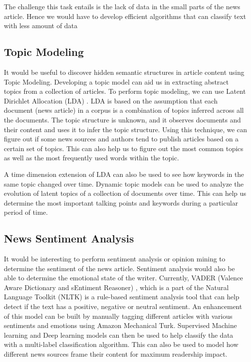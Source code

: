 \documentclass[11pt]{article}
\begin{document}
The challenge this task entails is the lack of data in the small parts of the news article. Hence we would have to develop efficient algorithms that can classify text with less amount of data


\subsection{Topic Modeling}

It would be useful to discover hidden semantic structures in article content using Topic Modeling. Developing a topic model can aid us in extracting abstract topics from a collection of articles. To perform topic modeling, we can use Latent Dirichlet Allocation (LDA) \cite{blei2002latent}. LDA is based on the assumption that each document (news article) in a corpus is a combination of topics inferred across all the documents. The topic structure is unknown, and it observes documents and their content and uses it to infer the topic structure\cite{jacobi2016quantitative}. Using this technique, we can figure out if some news sources and authors tend to publish articles based on a certain set of topics. This can also help us to figure out the most common topics as well as the most frequently used words within the topic. 

A time dimension extension of LDA can also be used to see how keywords in the same topic changed over time. Dynamic topic models \cite{blei2006dynamic} can be used to analyze the evolution of latent topics of a collection of documents over time. This can help us determine the most important talking points and keywords during a particular period of time. 

\subsection{News Sentiment Analysis}

It would be interesting to perform sentiment analysis or opinion mining to determine the sentiment of the news article. Sentiment analysis would also be able to determine the emotional state of the writer. Currently, VADER (Valence Aware Dictionary and sEntiment Reasoner) \cite{hutto2014vader}, which is a part of the Natural Language Toolkit (NLTK) is a rule-based sentiment analysis tool that can help detect if the text has a positive, negative or neutral sentiment. An enhancement of this model can be built by manually tagging different articles with various sentiments and emotions using Amazon Mechanical Turk. Supervised Machine learning and Deep learning models can then be used to help classify the data with a multi-label classification algorithm. This can also be used to model how different news sources frame their content for maximum readership impact.
\end{document}
